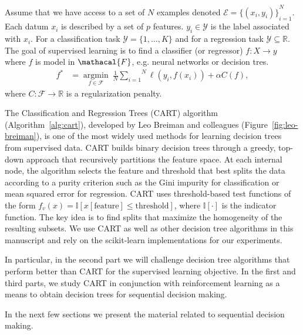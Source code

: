 \begin{definition}\label{def:sl}
    Assume that we have access to a set of $N$ examples denoted $\mathcal{E} = {\{(x_i, y_i)\}}_{i=1}^N$. Each datum $x_i$ is described by a set of $p$ features. $y_i \in {\mathcal Y}$ is the label associated with $x_i$.
    For a classification task $\mathcal{Y}=\{1,\ldots,K\}$ and for a regression task $\mathcal{Y}\subseteq \mathbb{R}$.
    The goal of supervised learning is to find a classifier (or regressor) $f:X \rightarrow  y$ where $f$ is model in $\mathacal{F}$, e.g. neural networks or decision tres.
    \begin{align}
        f^* &= \underset{f \in \mathcal{F}}{\operatorname{argmin}}\ \frac{1}{N}\overset{N}{\underset{i=1}{\sum}}{\ell}(y_i, f(x_i)) + \alpha C(f),
        \label{eq:suplearning}
    \end{align}
    where $C: \mathcal{F} \rightarrow \mathbb{R}$ is a regularization penalty.
    \end{definition}

The Classification and Regression Trees (CART) algorithm \cite{breiman1984classification} (Algorithm~\ref{alg:cart}), developed by Leo Breiman and colleagues (Figure~\ref{fig:leo-breiman}), is one of the most widely used methods for learning decision trees from supervised data.
CART builds binary decision trees through a greedy, top-down approach that recursively partitions the feature space. 
At each internal node, the algorithm selects the feature and threshold that best splits the data according to a purity criterion such as the Gini impurity for classification or mean squared error for regression.
CART uses threshold-based test functions of the form $f_v(x) = \mathbb{I}[x[\text{feature}] \leq \text{threshold}]$, where $\mathbb{I}[\cdot]$ is the indicator function. 
The key idea is to find splits that maximize the homogeneity of the resulting subsets. 
We use CART as well as other decision tree algorithms in this manuscript and rely on the scikit-learn implementations \cite{scikit-learn} for our experiments.

In particular, in the second part we will challenge decision tree algorithms that perform better than CART for the supervised learning objective.
In the first and third parts, we study CART in conjunction with reinforcement learning as a means to obtain decision trees for sequential decision making.

In the next few sections we present the material related to sequential decision making.

